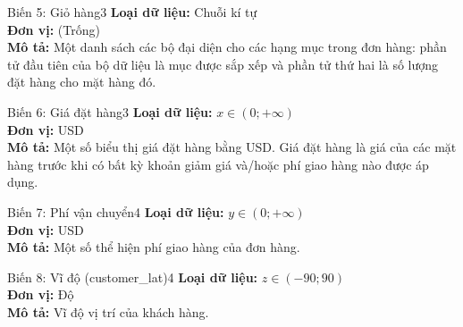 \noindent
\begin{minipage}[t]{0.48\textwidth}
\begin{mainbox}{Biến 5: Giỏ hàng}{3}
    \textbf{Loại dữ liệu:} Chuỗi kí tự \\
    \textbf{Đơn vị:} (Trống) \\
    \textbf{Mô tả:} Một danh sách các bộ đại diện cho các hạng mục trong đơn hàng: phần tử đầu tiên của bộ dữ liệu là mục được sắp xếp và phần tử thứ hai là số lượng đặt hàng cho mặt hàng đó.
\end{mainbox}
\end{minipage}
\hfill
\begin{minipage}[t]{0.48\textwidth}
\begin{mainbox}{Biến 6: Giá đặt hàng}{3}
    \textbf{Loại dữ liệu:} \(x \in (0; +\infty)\) \\
    \textbf{Đơn vị:} USD \\
    \textbf{Mô tả:} Một số biểu thị giá đặt hàng bằng USD. Giá đặt hàng là giá của các mặt hàng trước khi có bất kỳ khoản giảm giá và/hoặc phí giao hàng nào được áp dụng.
\end{mainbox}
\end{minipage}

\vspace{0.5cm}

\noindent
\begin{minipage}[t]{0.48\textwidth}
\begin{mainbox}{Biến 7: Phí vận chuyển}{4}
    \textbf{Loại dữ liệu:} \(y \in (0; +\infty)\) \\
    \textbf{Đơn vị:} USD \\
    \textbf{Mô tả:} Một số thể hiện phí giao hàng của đơn hàng.
\end{mainbox}
\end{minipage}
\hfill
\begin{minipage}[t]{0.48\textwidth}
\begin{mainbox}{Biến 8: Vĩ độ (customer\_lat)}{4}
    \textbf{Loại dữ liệu:} \(z \in (-90; 90)\) \\
    \textbf{Đơn vị:} Độ \\
    \textbf{Mô tả:} Vĩ độ vị trí của khách hàng.
\end{mainbox}
\end{minipage}

\vspace{0.5cm}

